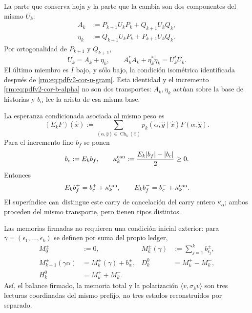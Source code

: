 La parte que conserva hoja y la parte que la cambia son dos componentes del
mismo \(U_k\):
\begin{align}
 A_k&:=P_{k+1}U_kP_k+Q_{k+1}U_kQ_k,
 \label{rm:eq:pdfv2-cor-a-comun}\\
 \eta_k&:=Q_{k+1}U_kP_k+P_{k+1}U_kQ_k.
 \label{rm:eq:pdfv2-cor-eta-comun}
\end{align}
Por ortogonalidad de \(P_{k+1}\) y \(Q_{k+1}\),
\begin{equation}
\label{rm:eq:pdfv2-cor-balance-hojas}
 U_k=A_k+\eta_k,\qquad
 A_k^*A_k+\eta_k^*\eta_k=U_k^*U_k.
\end{equation}
El último miembro es \(I\) bajo, y sólo bajo, la condición isométrica
identificada después de \eqref{rm:eq:pdfv2-cor-u-gram}.
Esta identidad y el incremento \eqref{rm:eq:pdfv2-cor-b-alpha} no son dos
transportes: \(A_k,\eta_k\) actúan sobre la base de historias y
\(b_\alpha\) lee la arista de esa misma base.

La esperanza condicionada asociada al mismo peso es
\begin{equation}
\label{rm:eq:pdfv2-cor-esperanza-comun}
 (E_kF)(\widehat x):=
 \sum_{(\alpha,\widehat y)\in\operatorname{Ch}_k(\widehat x)}
 p_k(\alpha,\widehat y\mid\widehat x)F(\alpha,\widehat y).
\end{equation}
Para el incremento fino \(b_f\) se ponen
\begin{equation}
\label{rm:eq:pdfv2-cor-kappa-jensen}
 b_c:=E_kb_f,\qquad
 \kappa_k^{\rm can}:=\frac{E_k|b_f|-|b_c|}{2}\geq0.
\end{equation}
Entonces
\begin{equation}
\label{rm:eq:pdfv2-cor-jensen-hojas}
 E_kb_f^+=b_c^++\kappa_k^{\rm can},\qquad
 E_kb_f^-=b_c^-+\kappa_k^{\rm can}.
\end{equation}
El superíndice \({\rm can}\) distingue este carry de cancelación del carry
entero \(\kappa_\alpha\); ambos proceden del mismo transporte, pero tienen
tipos distintos.

Las memorias firmadas no requieren una condición inicial exterior: para
\(\gamma=(\epsilon_1,\ldots,\epsilon_k)\) se definen por suma del propio
ledger,
\begin{equation}
\label{rm:eq:pdfv2-cor-memorias}
\begin{aligned}
 M_0^\pm&:=0,&
 M_k^\pm(\gamma)&:=\sum_{j=1}^k b_{\epsilon_j}^\pm,\\
 M_{k+1}^\pm(\gamma\alpha)&=M_k^\pm(\gamma)+b_\alpha^\pm,&
 D_k^0&=M_k^+-M_k^-,\\
 H_k^0&=M_k^++M_k^-.
\end{aligned}
\end{equation}
Así, el balance firmado, la memoria total y la polarización
\(\langle v,\sigma_kv\rangle\) son tres lecturas coordinadas del mismo
prefijo, no tres estados reconstruidos por separado.

